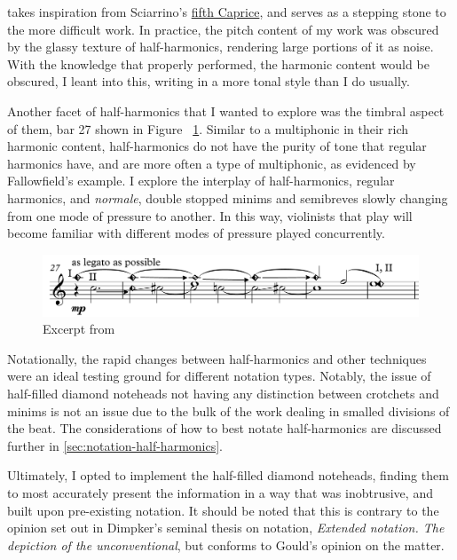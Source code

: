 \violinPiece takes inspiration from Sciarrino's \hyperref[fig:sciarrinoExcerpt]{fifth Caprice}, and serves as a stepping stone to the more difficult work.\autocite[]{sciarrinoCapricciViolino1976} 
In practice, the pitch content of my work was obscured by the glassy texture of half-harmonics, rendering large portions of it as noise. 
With the knowledge that properly performed, the harmonic content would be obscured, I leant into this, writing in a more tonal style than I do usually.

Another facet of half-harmonics that I wanted to explore was the timbral aspect of them, bar 27 shown in Figure ~\ref{fig:violinHalfHarmonicsExcerpt27}.
Similar to a multiphonic in their rich harmonic content, half-harmonics do not have the purity of tone that regular harmonics have, and are more often a type of multiphonic, as evidenced by Fallowfield's example.
I explore the interplay of half-harmonics, regular harmonics, and \emph{normale}, double stopped minims and semibreves slowly changing from one mode of pressure to another.
In this way, violinists that play \violinPiece will become familiar with different modes of pressure played concurrently.

\begin{figure}
    \includegraphics[width=\linewidth]{./resources/violinHalfHarmonicsExcerpt27.pdf}
    \caption{Excerpt from \violinPiece} \label{fig:violinHalfHarmonicsExcerpt27}
  \end{figure}

Notationally, the rapid changes between half-harmonics and other techniques were an ideal testing ground for different notation types. 
Notably, the issue of half-filled diamond noteheads not having any distinction between crotchets and minims is not an issue due to the bulk of the work dealing in smalled divisions of the beat.
The considerations of how to best notate half-harmonics are discussed further in \autoref{sec:notation-half-harmonics}.

Ultimately, I opted to implement the half-filled diamond noteheads, finding them to most accurately present the information in a way that was inobtrusive, and built upon pre-existing notation.
It should be noted that this is contrary to the opinion set out in Dimpker's seminal thesis on notation, \emph{Extended notation. The depiction of the
unconventional}, but conforms to Gould's opinion on the matter.\autocites[120-121]{dimpkerExtendedNotationDepiction2012}[61]{gouldBars2011}


